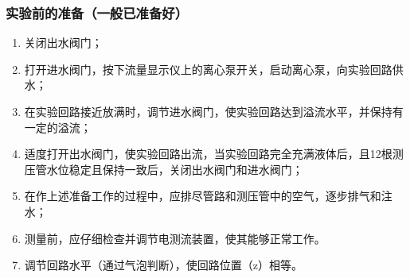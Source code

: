 \documentclass[dvipsnames, svgnames,a4paper,11pt]{article}
\begin{document}
	\subsubsection{实验前的准备（一般已准备好）}
	\begin{enumerate}
		\item 关闭出水阀门；
		\item 打开进水阀门，按下流量显示仪上的离心泵开关，启动离心泵，向实验回路供水；
		\item 在实验回路接近放满时，调节进水阀门，使实验回路达到溢流水平，并保持有一定的溢流；
		\item 适度打开出水阀门，使实验回路出流，当实验回路完全充满液体后，且12根测压管水位稳定且保持一致后，关闭出水阀门和进水阀门；
		\item 在作上述准备工作的过程中，应排尽管路和测压管中的空气，逐步排气和注水；
		\item 测量前，应仔细检查并调节电测流装置，使其能够正常工作。
		\item 调节回路水平（通过气泡判断），使回路位置（z）相等。		
	\end{enumerate}
	
	\clearpage
\end{document}
